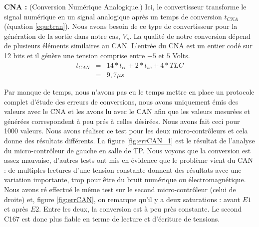 \hspace{3mm} \textbf{CNA :} (Conversion Numérique Analogique.) Ici, le convertisseur transforme le signal numérique en un signal analogique après un temps de conversion $t_{CNA}$ (équation \ref{equ:tcan}). Nous avons besoin de ce type de convertisseur pour la génération de la sortie dans notre cas, $V_{s}$. La qualité de notre conversion dépend de plusieurs éléments similaires au CAN. L'entrée du CNA est un entier codé sur 12 bits et il génère une tension comprise entre $-5$ et $5$ Volts. 
\begin{eqnarray}
\label{equ:tcan}
t_{CAN} &=& 14*t_{cc} + 2*t_{sc} + 4*TLC \\
&=&  9,7 \mu s%
\end{eqnarray}

Par manque de temps, nous n'avons pas eu le temps mettre en place un protocole complet d'étude des erreurs de conversions, nous avons uniquement émis des valeurs avec le CNA et les avons lu avec le CAN afin que les valeurs mesurées et générées correspondent à peu prés à celles désirées. Nous avons fait ceci pour 1000 valeurs. Nous avons réaliser ce test pour les deux micro-contrôleurs et cela donne des résultats différents. La figure \ref{fig:errCAN_1} est le résultat de l'analyse du micro-contrôleur de gauche en salle de TP. Nous voyons que la conversion est assez mauvaise, d'autres tests ont mis en évidence que le problème vient du CAN : de multiples lectures d'une tension constante donnent des résultats avec une variation importante, trop pour être du bruit numérique ou électromagnétique. Nous avons ré effectué le même test sur le second micro-contrôleur (celui de droite) et, figure \ref{fig:errCAN}, on remarque qu'il y a deux saturations : avant $E1$ et après $E2$. Entre les deux, la conversion est à peu près constante. Le second C167 est donc plus fiable en terme de lecture et d'écriture de tensions.


